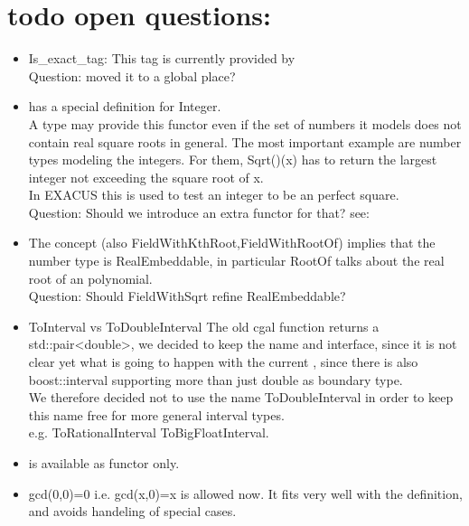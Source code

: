 


\section{todo open questions:}

\begin{itemize} 
\item Is\_exact\_tag: This tag is currently provided by \\
Question: moved it to a global place? 
\item {} has a special definition for Integer. \\
        A type may provide this functor even if the set of 
        numbers it models does not contain real square roots in general. 
        The most important example are number types modeling the integers. 
        For them, Sqrt()(x) has to return the largest integer not exceeding 
        the square root of x.\\
        In EXACUS this is used to test an integer to be an perfect square. \\
        Question: Should we introduce an extra functor for that?
        see: 
\item The concept  (also FieldWithKthRoot,FieldWithRootOf) 
      implies that the number type is RealEmbeddable, in particular RootOf talks 
      about the real root of an polynomial.\\
      Question: Should FieldWithSqrt refine RealEmbeddable?  
\item ToInterval vs ToDoubleInterval The old cgal function 
       returns a
      std::pair<double>, we decided to keep the name and interface, since it is not 
      clear yet what is going to happen with the current , 
      since there is also boost::interval supporting more than just double as 
      boundary type.\\
      We therefore decided not to use the name ToDoubleInterval in order to keep 
      this name free for more general interval types. \\
      e.g. ToRationalInterval ToBigFloatInterval. 
\item {} is available as functor only.
\item gcd(0,0)=0 i.e. gcd(x,0)=x is allowed now. 
      It fits very well with the definition,  and avoids handeling of special cases. 
\end{itemize}

